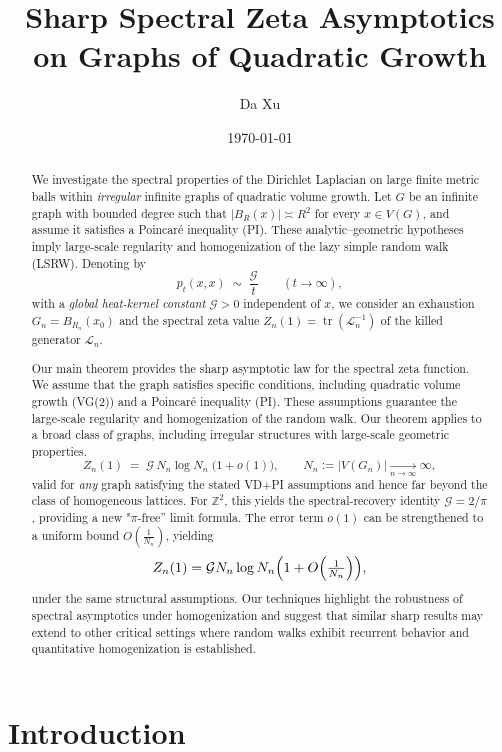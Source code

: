 \documentclass[12pt]{amsart}
\title{Sharp Spectral Zeta Asymptotics on Graphs of Quadratic Growth}
\author{Da Xu}
\date{\today}
\theoremstyle{definition}
\theoremstyle{remark}
\newcommand{\cG}{\mathcal{G}}    %
\newcommand{\LL}{\mathcal{L}} %
\begin{document}
\begin{abstract}
We investigate the spectral properties of the Dirichlet Laplacian on large finite metric balls within \emph{irregular} infinite graphs of quadratic volume growth.
Let $G$ be an infinite graph with bounded degree such that $|B_R(x)| \asymp R^{2}$ for every $x\in V(G)$, and assume it satisfies a Poincaré inequality (PI).
These analytic–geometric hypotheses imply large-scale regularity and homogenization of the lazy simple random walk (LSRW).
Denoting by
\[
    p_t(x,x)\;\sim\;\frac{\cG}{t}\qquad(t\to\infty),
\]
with a \emph{global heat-kernel constant} $\cG>0$ independent of $x$, we consider an exhaustion $G_n=B_{R_n}(x_0)$ and the spectral zeta value
$Z_n(1)=\operatorname{tr}(\LL_n^{-1})$ of the killed generator $\LL_n$.

Our main theorem provides the sharp asymptotic law for the spectral zeta function. We assume that the graph satisfies specific conditions, including quadratic volume growth (VG(2)) and a Poincaré inequality (PI). These assumptions guarantee the large-scale regularity and homogenization of the random walk. Our theorem applies to a broad class of graphs, including irregular structures with large-scale geometric properties.
\[
    Z_n(1)\;=\;\cG\,N_n\log N_n\;\bigl(1+o(1)\bigr),\qquad N_n:=|V(G_n)|\xrightarrow[n\to\infty]{}\infty,
\]
valid for \emph{any} graph satisfying the stated VD+PI assumptions and hence far beyond the class of homogeneous lattices.
For $\mathbb Z^2$, this yields the spectral-recovery identity $\cG = 2/\pi$, providing a new "$\pi$-free'' limit formula.
The error term \( o(1) \) can be strengthened to a uniform bound \( O\!\left(\tfrac{1}{N_n}\right) \), yielding
\[
	Z_n(1)=\cG N_n \log N_n \Bigl(1+ O\!\left(\tfrac{1}{N_n}\right)\Bigr),
\]
under the same structural assumptions.
Our techniques highlight the robustness of spectral asymptotics under homogenization and suggest that similar sharp results may extend to other critical settings where random walks exhibit recurrent behavior and quantitative homogenization is established.
\end{abstract}

\maketitle

\section{Introduction}
\end{document}
